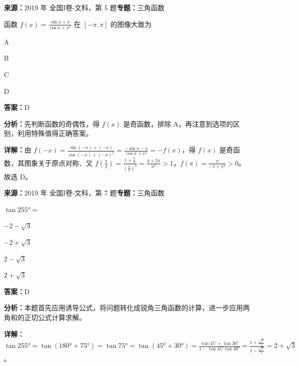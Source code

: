 \begin{question}[points=5]
\textbf{来源：}2019 年 全国I卷-文科，第 5 题\quad \textbf{专题：}三角函数\par
函数 $f(x)=\frac{\sin x + x}{\cos x + x^2}$ 在 $[-\pi,\pi]$ 的图像大致为
\begin{choices}
  \item A
  \item B
  \item C
  \item D
\end{choices}
\begin{solution}
\textbf{答案：}D

\textbf{分析：}先判断函数的奇偶性，得 $f(x)$ 是奇函数，排除 A，再注意到选项的区别，利用特殊值得正确答案。

\textbf{详解：}由 $f(-x)=\frac{\sin(-x)+(-x)}{\cos(-x)+(-x)^2} = \frac{-\sin x - x}{\cos x + x^2} = -f(x)$，得 $f(x)$ 是奇函数，其图象关于原点对称．又 $f(\frac{\pi}{2}) = \frac{1+\frac{\pi}{2}}{(\frac{\pi}{2})^2} = \frac{4+2\pi}{\pi^2} > 1$，$f(\pi) = \frac{\pi}{-1+\pi^2} > 0$。故选 D。
\end{solution}
\end{question}

\begin{question}[points=5]
\textbf{来源：}2019 年 全国I卷-文科，第 7 题\quad \textbf{专题：}三角函数\par
$\tan 255° =$
\begin{choices}
  \item $-2-\sqrt{3}$
  \item $-2+\sqrt{3}$
  \item $2-\sqrt{3}$
  \item $2+\sqrt{3}$
\end{choices}
\begin{solution}
\textbf{答案：}D

\textbf{分析：}本题首先应用诱导公式，将问题转化成锐角三角函数的计算，进一步应用两角和的正切公式计算求解。

\textbf{详解：}$\tan 255° = \tan(180°+75°) = \tan 75° = \tan(45°+30°) = \frac{\tan 45°+\tan 30°}{1-\tan 45°\tan 30°} = \frac{1+\frac{\sqrt{3}}{3}}{1-\frac{\sqrt{3}}{3}} = 2+\sqrt{3}$。
\end{solution}
\end{question}

